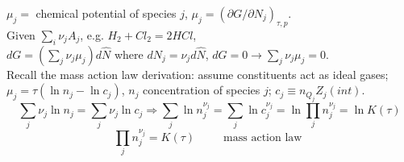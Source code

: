 $\mu_j = $ chemical potential of species $j$, $\mu_j = (\partial G/\partial N_j)_{ \tau, p}$.   \quad \\ 

Given $\sum_i \nu_j A_j$, e.g. $H_2 + Cl_2 = 2HCl$, \\
$dG = (\sum_j \nu_j \mu_j )d\hat{N}$ where $dN_j = \nu_j d\hat{N}$, $dG = 0 \to \sum_j \nu_j \mu_j =0$.   \quad \\ 

Recall the mass action law derivation: assume constituents act as ideal gases; $\mu_j  = \tau(\ln{n_j} - \ln{c_j})$, $n_j$ concentration of species $j$; $c_j \equiv n_{Q_j} Z_j(int)$.  
\[
\sum_j \nu_j\ln{n_j} = \sum_j \nu_j \ln{c_j} \Longrightarrow \sum_j \ln{n_j^{\nu_j}} = \sum_j \ln{c_j^{\nu_j}} = \ln{ \prod_j n_j^{\nu_j} } = \ln{ K(\tau) }
\]
\[
\prod_j n_j^{\nu_j} = K(\tau) \quad \quad \, \text{ mass action law }
\]
\hrulefill

